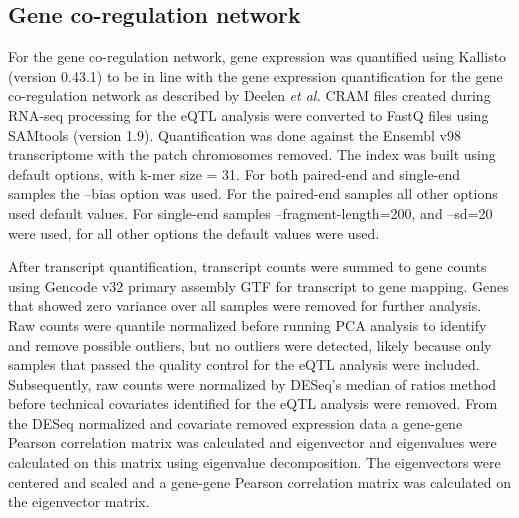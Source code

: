 {{\subsection{Gene co-regulation network}
For the gene co-regulation network, gene expression was quantified using Kallisto\cite{brayNearoptimalProbabilisticRNAseq2016} (version 0.43.1) to be in line with the gene expression quantification for the gene co-regulation network as described by Deelen \emph{et al.}\cite{deelenImprovingDiagnosticYield2019}  CRAM files created during RNA-seq processing for the eQTL analysis were converted to FastQ files using SAMtools\cite{liSequenceAlignmentMap2009} (version 1.9). Quantification was done against the Ensembl\cite{cunninghamEnsembl20192019} v98 transcriptome with the patch chromosomes removed. The index was built using default options, with k-mer size = 31. For both paired-end and single-end samples the –bias option was used. For the paired-end samples all other options used default values. For single-end samples –fragment-length=200, and –sd=20 were used, for all other options the default values were used. 

After transcript quantification, transcript counts were summed to gene counts using Gencode\cite{frankishGENCODEReferenceAnnotation2019} v32 primary assembly GTF for transcript to gene mapping.  Genes that showed zero variance over all samples were removed for further analysis. Raw counts were quantile normalized before running PCA analysis to identify and remove possible outliers, but no outliers were detected, likely because only samples that passed the quality control for the eQTL analysis were included. Subsequently, raw counts were normalized by DESeq’s\cite{loveModeratedEstimationFold2014} median of ratios method before technical covariates identified for the eQTL analysis were removed. From the DESeq\cite{loveModeratedEstimationFold2014} normalized and covariate removed expression data a gene-gene Pearson correlation matrix was calculated and eigenvector and eigenvalues were calculated on this matrix using eigenvalue decomposition. The eigenvectors were centered and scaled and a gene-gene Pearson correlation matrix was calculated on the eigenvector matrix. 

}}
